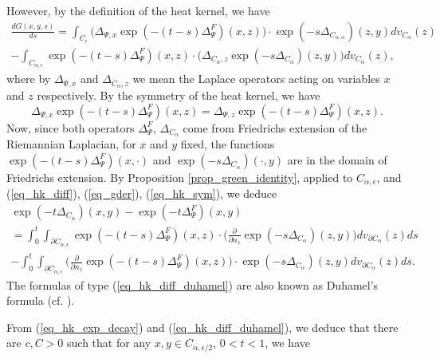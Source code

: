 \documentclass[12pt]{article}
\numberwithin{equation}{section}
\theoremstyle{theorem}
\theoremstyle{definition}
\theoremstyle{remark}
\newcommand{\laplcomp}{\Delta}
\begin{document}
	However, by the definition of the heat kernel, we have
	\begin{multline}\label{eq_gder}
		\frac{d G(x, y, s)}{ds} = \int_{C_{\epsilon}} \Big( \laplcomp_{\Psi, x} \exp(- (t-s) \laplcomp_{\Psi}^{F})(x, z) \Big) \cdot \exp(- s \laplcomp_{C_{\alpha, \alpha}})(z, y) dv_{C_{\alpha}}(z) 
		\\
		-
		\int_{C_{\alpha, \epsilon}} \exp(- (t-s) \laplcomp_{\Psi}^{F})(x, z) \cdot \Big(  \laplcomp_{C_{\alpha}, z} \exp(- s \laplcomp_{C_{\alpha}})(z, y) \Big) dv_{C_{\alpha}}(z),
	\end{multline}
	where by $\laplcomp_{\Psi, x}$ and $\laplcomp_{C_{\alpha}, z}$ we mean the Laplace operators acting on variables $x$ and $z$ respectively.
	By the symmetry of the heat kernel, we have
	\begin{equation}\label{eq_hk_sym}
		\laplcomp_{\Psi, x} \exp(- (t-s) \laplcomp_{\Psi}^{F})(x, z)  = \laplcomp_{\Psi, z} \exp(- (t-s) \laplcomp_{\Psi}^{F})(x, z).
	\end{equation}
	Now, since both operators $\laplcomp_{\Psi}^{F}$, $\laplcomp_{C_{\alpha}}$ come from Friedrichs extension of the Riemannian Laplacian, for $x$ and $y$ fixed, the functions $\exp(- (t-s) \laplcomp_{\Psi}^{F})(x, \cdot)$ and $\exp(- s \laplcomp_{C_{\alpha}})(\cdot, y)$ are in the domain of Friedrichs extension.
	By Proposition \ref{prop_green_identity}, applied to $C_{\alpha, \epsilon}$, and (\ref{eq_hk_diff}), (\ref{eq_gder}), (\ref{eq_hk_sym}), we deduce
	\begin{multline}\label{eq_hk_diff_duhamel}
		\exp(- t \laplcomp_{C_{\alpha}})(x, y) -  \exp(- t \laplcomp_{\Psi}^{F})(x, y) 
		\\
		= 
		\int_{0}^{t} 
		\int_{\partial C_{\alpha, \epsilon}}
		 \exp(- (t-s) \laplcomp_{\Psi}^{F})(x, z)  \cdot
		\Big( \frac{\partial}{\partial n_z} \exp(- s \laplcomp_{C_{\alpha}})(z, y)\Big) 
		dv_{\partial C_{\alpha}}(z)
		ds
		\\
		-
		\int_{0}^{t} 
		\int_{\partial C_{\alpha, \epsilon}}
		\Big( \frac{\partial}{\partial n_z} \exp(- (t-s) \laplcomp_{\Psi}^{F})(x, z) \Big) \cdot \exp(- s \laplcomp_{C_{\alpha}})(z, y)
		dv_{\partial C_{\alpha}}(z)
		ds
		.
	\end{multline}
	The formulas of type (\ref{eq_hk_diff_duhamel}) are also known as Duhamel's formula (cf. \cite[Theorem 2.48]{BGV}).
	\par 
	From (\ref{eq_hk_exp_decay}) and (\ref{eq_hk_diff_duhamel}), we deduce that there are $c, C > 0$ such that for any $x, y \in C_{\alpha, \epsilon / 2}$, $0 < t < 1$, we have
\end{document}
